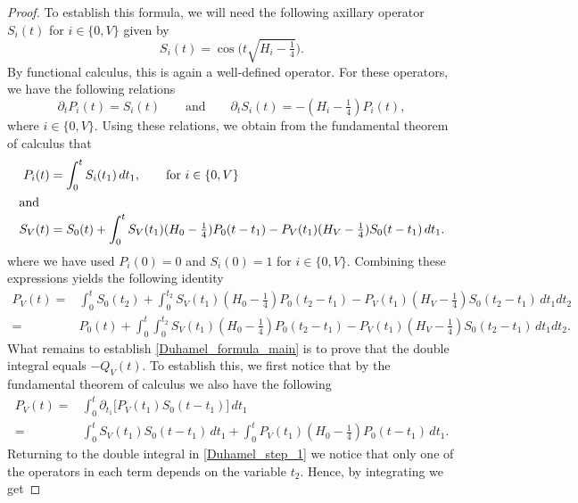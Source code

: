 \documentclass[11pt,twoside,reqno]{amsart}
\newcommand{\1}{\mathrm{\mathbf{1}}}
\numberwithin{equation}{section}
\theoremstyle{plain}
\theoremstyle{definition}
\theoremstyle{remark}
\begin{document}
\begin{proof}
  To establish this formula, we will need the following axillary operator $S_{i}(t)$ for $i\in\{0,V\}$ given by
\begin{equation*}
    S_i(t) =\cos \big(t\sqrt{H_i-\tfrac14}\big).
\end{equation*}
By functional calculus, this is again a well-defined operator. For these operators, we have the following relations
$$ 
\partial _t P_i(t) = S_i(t) \qquad\text{and}\qquad \partial_t S_i(t) = - (H_i-\tfrac14) P_i(t), 
$$
where $i\in\{0,V\}$. Using these relations, we obtain from the fundamental theorem of calculus that 
\begin{align*}
    P_i(t) &= \int_{0}^t S_i (t_1) \, dt_1, \qquad\text{for $i\in\{0,V\}$}
    \\
    \shortintertext{and}
     S_V(t) &= S_0(t)+  \int_{0}^t S_V(t_1) (H_0-\tfrac14) P_0(t-t_1) -P_V(t_1) (H_V-\tfrac14) S_0(t-t_1) \, dt_1.
\end{align*}
where we have used $P_i(0) = 0$ and $S_i(0)=1$ for $i\in\{0,V\}$. Combining these expressions yields the following identity
\begin{equation}\label{Duhamel_step_1}
    \begin{aligned}
       P_V(t)
         ={}&\int_{0}^{t} S_0(t_2) + \int_{0}^{t_2} S_V(t_1) (H_0-\tfrac14) P_0(t_2-t_1) -P_V(t_1) (H_V-\tfrac14) S_0(t_2-t_1) \, dt_1 dt_2
        \\
        ={}& P_0(t)+ \int_{0}^{t} \int_{0}^{t_2} S_V(t_1) (H_0-\tfrac14) P_0(t_2-t_1) - P_V(t_1)( H_V-\tfrac14) S_0(t_2-t_1) \,  dt_1 dt_2.
    \end{aligned}
\end{equation}
What remains to establish \eqref{Duhamel_formula_main} is to prove that the double integral equals $-Q_V(t)$. To establish this, we first notice that by the fundamental theorem of calculus we also have the following 
\begin{equation}\label{Duhamel_step_2}
     \begin{aligned}
       P_V(t)
         ={}&\int_{0}^{t}\partial_{t_1} \big[  P_V(t_1) S_0(t-t_1)\big]  \, dt_1
        \\
        ={}& \int_{0}^{t}  S_V(t_1) S_0(t-t_1)  \, dt_1 + \int_{0}^{t} P_V(t_1) (H_0-\tfrac14) P_0(t-t_1)  \, dt_1.
    \end{aligned}
\end{equation}
Returning to the double integral in \eqref{Duhamel_step_1} we notice that only one of the operators in each term depends on the variable $t_2$. Hence, by integrating we get

\end{proof}
\end{document}
